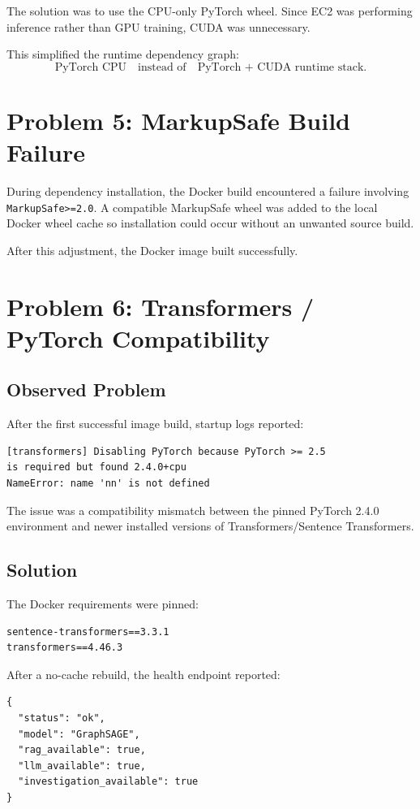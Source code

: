 \documentclass[11pt,a4paper]{article}
\begin{document}
The solution was to use the CPU-only PyTorch wheel. Since EC2 was performing inference rather than GPU training, CUDA was unnecessary.

This simplified the runtime dependency graph:
\[
\text{PyTorch CPU} \quad \text{instead of} \quad
\text{PyTorch + CUDA runtime stack}.
\]

\section{Problem 5: MarkupSafe Build Failure}
During dependency installation, the Docker build encountered a failure involving \texttt{MarkupSafe>=2.0}. A compatible MarkupSafe wheel was added to the local Docker wheel cache so installation could occur without an unwanted source build.

After this adjustment, the Docker image built successfully.

\section{Problem 6: Transformers / PyTorch Compatibility}
\subsection{Observed Problem}
After the first successful image build, startup logs reported:
\begin{lstlisting}
[transformers] Disabling PyTorch because PyTorch >= 2.5
is required but found 2.4.0+cpu
NameError: name 'nn' is not defined
\end{lstlisting}

The issue was a compatibility mismatch between the pinned PyTorch 2.4.0 environment and newer installed versions of Transformers/Sentence Transformers.

\subsection{Solution}
The Docker requirements were pinned:
\begin{lstlisting}
sentence-transformers==3.3.1
transformers==4.46.3
\end{lstlisting}

After a no-cache rebuild, the health endpoint reported:
\begin{lstlisting}
{
  "status": "ok",
  "model": "GraphSAGE",
  "rag_available": true,
  "llm_available": true,
  "investigation_available": true
}
\end{lstlisting}
\end{document}

